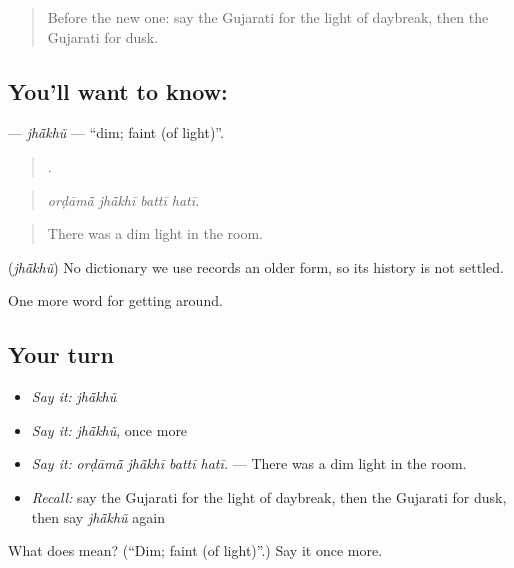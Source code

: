 \begin{quote}
Before the new one: say the Gujarati for the light of daybreak, then the Gujarati for dusk.
\end{quote}

\subsection*{You'll want to know: }
\textbf{} — \emph{jhā̃khũ} — \textquotedblleft{}dim; faint (of light)\textquotedblright{}.

\begin{quote}
   .
\end{quote}

\begin{quote}
\emph{orḍāmā̃ jhā̃khī battī hatī.}
\end{quote}

\begin{quote}
There was a dim light in the room.
\end{quote}

\begin{cousinweb}
\textbf{} (\emph{jhā̃khũ}) No dictionary we use records an older form, so its history is not settled.
\end{cousinweb}

\begin{grammarlens}[title={What you've built}]
One more word for getting around.
\end{grammarlens}

\subsection*{Your turn}
\begin{itemize}
\raggedright
  \item \emph{Say it:} \emph{jhā̃khũ}
  \item \emph{Say it:} \emph{jhā̃khũ}, once more
  \item \emph{Say it:} \emph{orḍāmā̃ jhā̃khī battī hatī.} — There was a dim light in the room.
  \item \emph{Recall:} say the Gujarati for the light of daybreak, then the Gujarati for dusk, then say \emph{jhā̃khũ} again
\end{itemize}

\begin{tcolorbox}[breakable,colback=teal!4,colframe=teal!35!black,title={Before you move on}]
What does  mean? (\textquotedblleft{}Dim; faint (of light)\textquotedblright{}.) Say it once more.
\end{tcolorbox}
